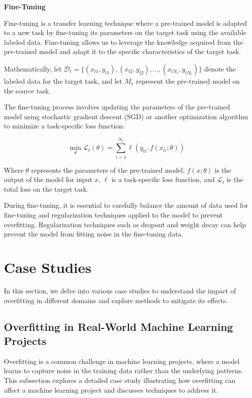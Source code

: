\documentclass[12pt]{book} %
\begin{document}
\textbf{Fine-Tuning}

Fine-tuning is a transfer learning technique where a pre-trained model is adapted to a new task by fine-tuning its parameters on the target task using the available labeled data. Fine-tuning allows us to leverage the knowledge acquired from the pre-trained model and adapt it to the specific characteristics of the target task.

Mathematically, let \( \mathcal{D}_t = \{(x_{t1}, y_{t1}), (x_{t2}, y_{t2}), ..., (x_{tN_t}, y_{tN_t})\} \) denote the labeled data for the target task, and let \( M_s \) represent the pre-trained model on the source task.

The fine-tuning process involves updating the parameters of the pre-trained model using stochastic gradient descent (SGD) or another optimization algorithm to minimize a task-specific loss function:

\[
\min_{\theta} \mathcal{L}_t(\theta) = \sum_{i=1}^{N_t} \ell(y_{ti}, f(x_{ti}; \theta))
\]

Where \( \theta \) represents the parameters of the pre-trained model, \( f(x; \theta) \) is the output of the model for input \( x \), \( \ell \) is a task-specific loss function, and \( \mathcal{L}_t \) is the total loss on the target task.

During fine-tuning, it is essential to carefully balance the amount of data used for fine-tuning and regularization techniques applied to the model to prevent overfitting. Regularization techniques such as dropout and weight decay can help prevent the model from fitting noise in the fine-tuning data.

\section{Case Studies}

In this section, we delve into various case studies to understand the impact of overfitting in different domains and explore methods to mitigate its effects.

\subsection{Overfitting in Real-World Machine Learning Projects}

Overfitting is a common challenge in machine learning projects, where a model learns to capture noise in the training data rather than the underlying patterns. This subsection explores a detailed case study illustrating how overfitting can affect a machine learning project and discusses techniques to address it.
\end{document}
